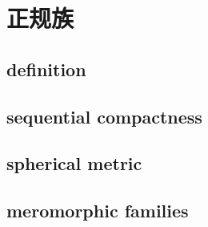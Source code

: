 \section{正规族}
\label{b3:sec:0402}


\subsection{definition}
\label{b3:subsec:040201}

\subsection{sequential compactness}
\label{b3:subsec:040202}

\subsection{spherical metric}
\label{b3:subsec:040203}

\subsection{meromorphic families}
\label{b3:subsec:040204}


